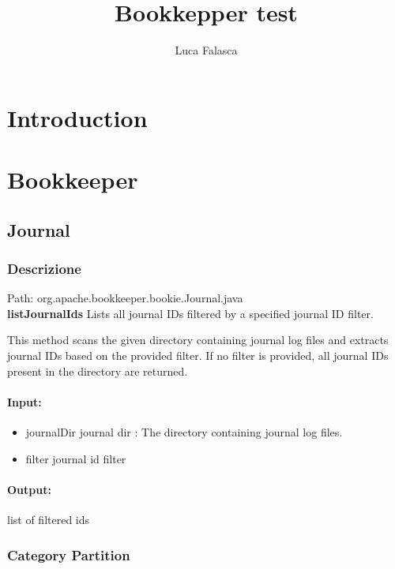 \documentclass[12pt, a4paper]{article}
\title{Bookkepper test}
\author{Luca Falasca}
\begin{document}
\maketitle

\thispagestyle{empty}
\tableofcontents

\listoffigures
\listoftables
{}

\thispagestyle{empty}
\newpage
\setcounter{page}{1}
\section{Introduction}

\section{Bookkeeper}
\subsection{Journal}

\subsubsection{Descrizione}
Path: org.apache.bookkeeper.bookie.Journal.java \\
\textbf{listJournalIds}
Lists all journal IDs filtered by a specified journal ID filter.

This method scans the given directory containing journal log files and extracts
journal IDs based on the provided filter. If no filter is provided, all journal
IDs present in the directory are returned.


\paragraph{Input:}
\begin{itemize}
  \item journalDir journal dir : The directory containing journal log files.
  \item filter journal id filter
\end{itemize}
\paragraph{Output:}
    list of filtered ids

\subsubsection{Category Partition}
\end{document}
